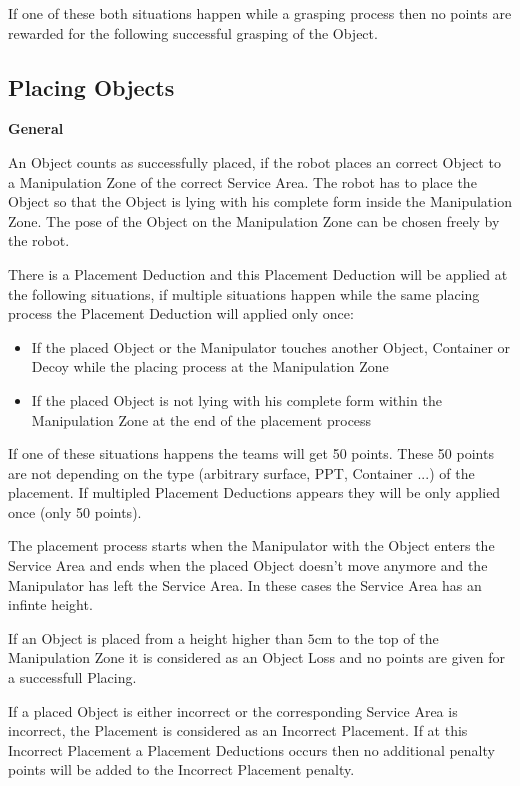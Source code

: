 If one of these both situations happen while a grasping process then no points are rewarded for the following successful grasping of the Object.

\subsection{Placing Objects} \label{ssec:PlacingObjects}

\textbf{General}

An Object counts as successfully placed, if the robot places an correct Object to a Manipulation Zone of the correct Service Area. The robot has to place the Object so that the Object is lying with his complete form inside the Manipulation Zone. The pose of the Object on the Manipulation Zone can be chosen freely by the robot.

There is a Placement Deduction and this Placement Deduction will be applied at the following situations, if multiple situations happen while the same placing process the Placement Deduction will applied only once:

\begin{itemize}
	\item If the placed Object or the Manipulator touches another Object, Container or Decoy while the placing process at the Manipulation Zone 
	\item If the placed Object is not lying with his complete form within the Manipulation Zone at the end of the placement process
\end{itemize}

If one of these situations happens the teams will get 50 points. These 50 points are not depending on the type (arbitrary surface, PPT, Container ...) of the placement. If multipled Placement Deductions appears they will be only applied once (only 50 points).

The placement process starts when the Manipulator with the Object enters the Service Area and ends when the placed Object doesn't move anymore and the Manipulator has left the Service Area. In these cases the Service Area has an infinte height.

If an Object is placed from a height higher than $5\si{\centi\meter}$ to the top of the Manipulation Zone it is considered as an Object Loss and no points are given for a successfull Placing.

If a placed Object is either incorrect or the corresponding Service Area is incorrect, the Placement is considered as an Incorrect Placement. If at this Incorrect Placement a Placement Deductions occurs then no additional penalty points will be added to the Incorrect Placement penalty.

